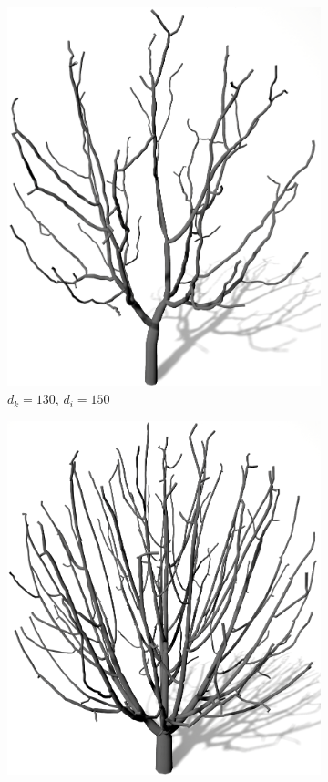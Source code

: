 \begin{figure} [hbtp]
\begin{subfigure}[t]{.45\textwidth}
		\includegraphics[height=.21\textheight]{images/SCA_KDRI_HighKD_LowRI.png}
		\caption{$d_k = 130$, $d_i = 150$}
		\label{subfig:SCA_KDRI_HighKD_LowRI}
	\end{subfigure}	
	\begin{subfigure}[t]{.45\textwidth}
		\centering
		\includegraphics[height=.21\textheight]{images/SCA_KDRI_LowKD_HighRI.png}

\end{subfigure}
\end{figure}
